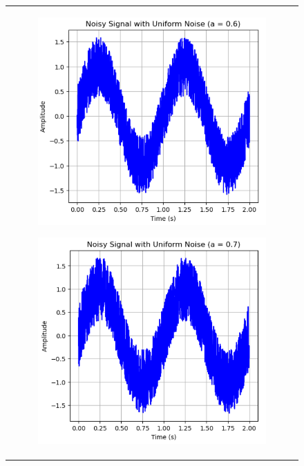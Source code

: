 \documentclass[hidelinks,12pt]{article}
\begin{document}
\begin{figure}[!h]
\begin{tabular}{c}
			\begin{subfigure}[h]{0.3\textwidth}
				\centering
				\includegraphics[width=\textwidth]{figures/uniform_noise/0.6.png}
			\end{subfigure}
			\hfill
			\begin{subfigure}[h]{0.3\textwidth}
				\centering
				\includegraphics[width=\textwidth]{figures/uniform_noise/0.7.png}

\end{subfigure}
\end{tabular}
\end{figure}
\end{document}
